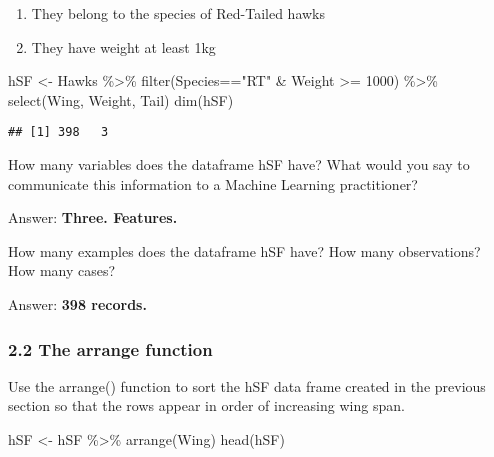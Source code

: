 \documentclass[
]{article}
\newenvironment{Shaded}{\begin{snugshade}}{\end{snugshade}}
\newcommand{\DecValTok}[1]{\textcolor[rgb]{0.00,0.00,0.81}{#1}}
\newcommand{\FunctionTok}[1]{\textcolor[rgb]{0.00,0.00,0.00}{#1}}
\newcommand{\NormalTok}[1]{#1}
\newcommand{\OtherTok}[1]{\textcolor[rgb]{0.56,0.35,0.01}{#1}}
\newcommand{\SpecialCharTok}[1]{\textcolor[rgb]{0.00,0.00,0.00}{#1}}
\newcommand{\StringTok}[1]{\textcolor[rgb]{0.31,0.60,0.02}{#1}}
\providecommand{\tightlist}{%
  \setlength{\itemsep}{0pt}\setlength{\parskip}{0pt}}
\begin{document}
\begin{enumerate}
\def\labelenumi{\alph{enumi})}
\tightlist
\item
  They belong to the species of Red-Tailed hawks\\
\item
  They have weight at least 1kg
\end{enumerate}

\begin{Shaded}
\begin{Highlighting}[]
\NormalTok{hSF }\OtherTok{\textless{}{-}}\NormalTok{ Hawks }\SpecialCharTok{\%\textgreater{}\%} \FunctionTok{filter}\NormalTok{(Species}\SpecialCharTok{==}\StringTok{"RT"} \SpecialCharTok{\&}\NormalTok{ Weight }\SpecialCharTok{\textgreater{}=} \DecValTok{1000}\NormalTok{) }\SpecialCharTok{\%\textgreater{}\%} \FunctionTok{select}\NormalTok{(Wing, Weight, Tail)}
\FunctionTok{dim}\NormalTok{(hSF)}
\end{Highlighting}
\end{Shaded}

\begin{verbatim}
## [1] 398   3
\end{verbatim}

How many variables does the dataframe hSF have? What would you say to
communicate this information to a Machine Learning practitioner?

Answer: \textbf{Three. Features.}

How many examples does the dataframe hSF have? How many observations?
How many cases?

Answer: \textbf{398 records.}

\hypertarget{the-arrange-function}{%
\subsubsection{2.2 The arrange function}\label{the-arrange-function}}

Use the arrange() function to sort the hSF data frame created in the
previous section so that the rows appear in order of increasing wing
span.

\begin{Shaded}
\begin{Highlighting}[]
\NormalTok{hSF }\OtherTok{\textless{}{-}}\NormalTok{ hSF }\SpecialCharTok{\%\textgreater{}\%} \FunctionTok{arrange}\NormalTok{(Wing)}
\FunctionTok{head}\NormalTok{(hSF)}
\end{Highlighting}
\end{Shaded}
\end{document}
